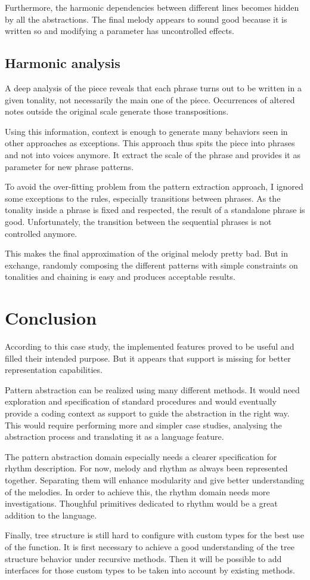 \documentclass[twocolumn, 11pt]{article}
\begin{document}
Furthermore, the harmonic dependencies between different lines becomes hidden by all the abstractions. The final melody appears to sound good because it is written so and modifying a parameter has uncontrolled effects.

\subsection{Harmonic analysis}

A deep analysis of the piece reveals that each phrase turns out to be written in a given tonality, not necessarily the main one of the piece.
Occurrences of altered notes outside the original scale generate those transpositions.

Using this information, context is enough to generate many behaviors seen in other approaches as exceptions.
This approach thus spits the piece into phrases and not into voices anymore. It extract the scale of the phrase and provides it as parameter for new phrase patterns.

To avoid the over-fitting problem from the pattern extraction approach, I ignored some exceptions to the rules, especially transitions between phrases. As the tonality inside a phrase is fixed and respected, the result of a standalone phrase is good. Unfortunately, the transition between the sequential phrases is not controlled anymore.


This makes the final approximation of the original melody pretty bad. But in exchange, randomly composing the different patterns with simple constraints on tonalities and chaining is easy and produces acceptable results.


\section{Conclusion}

According to this case study, the implemented features proved to be useful and filled their intended purpose.
But it appears that support is missing for better representation capabilities.

Pattern abstraction can be realized using many different methods. It would need exploration and specification of standard procedures and would eventually provide a coding context as support to guide the abstraction in the right way.
This would require performing more and simpler case studies, analysing the abstraction process and translating it as a language feature.

The pattern abstraction domain especially needs a clearer specification for rhythm description. For now, melody and rhythm as always been represented together. Separating them will enhance modularity and give better understanding of the melodies.
In order to achieve this, the rhythm domain needs more investigations. Thoughful primitives dedicated to rhythm would be a great addition to the language.

Finally, tree structure is still hard to configure with custom types for the best use of the  function. It is first necessary to achieve a good understanding of the tree structure behavior under recursive methods. Then it will be possible to add interfaces for those custom types to be taken into account by existing methods.
\end{document}
